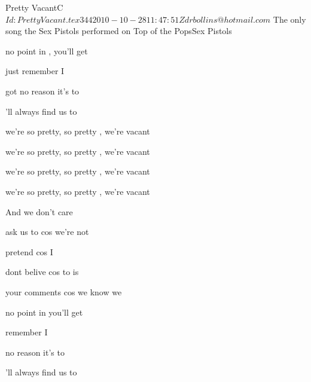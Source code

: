 \begin{SBSong}{Pretty Vacant}{C}
   {$Id: PrettyVacant.tex 344 2010-10-28 11:47:51Z drbollins@hotmail.com $}
   {The only song the Sex Pistols performed on Top of the Pops}{Sex Pistols}
  \begin{SBVerse}
     no point in , you'll get  

     just remember I  
    
     got no reason it's  to 
     
    'll always find us  to 
  \end{SBVerse}
  \begin{SBChorus}
     we're so pretty,  so pretty , we're vacant

     we're so pretty,  so pretty , we're vacant

     we're so pretty,  so pretty , we're vacant

     we're so pretty,  so pretty , we're vacant
    
    And we don't care
  \end{SBChorus}
  \begin{SBVerse}
     ask us to  cos we're not  

     pretend cos I  

     dont belive  cos to  is 

     your  comments cos we know  we 
  \end{SBVerse}
  \begin{SBVerse}
     no point in  you'll get  

     remember I  
    
     no reason it's  to 
     
    'll always find us  to 
  \end{SBVerse}
\end{SBSong}

